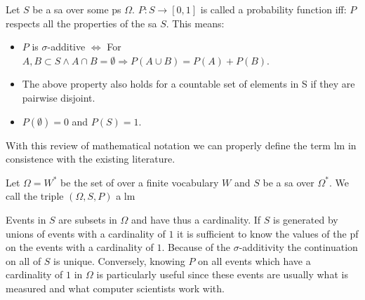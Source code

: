 \documentclass[•]{book}
\begin{document}
\begin{definition}\label{def:pf}
Let $S$ be a \gls{sa} over some \gls{ps} $\Omega$. $P:S\longrightarrow [0,1]$ is called a probability function iff: 
$P$ respects all the properties of the \gls{sa} $S$.
This means: 
\begin{itemize}
\item $P$ is $\sigma$-additive $\Leftrightarrow$ For $A,B \subset S \land A\cap B = \emptyset \Rightarrow P(A\cup B) = P(A)+P(B)$.
\item The above property also holds for a countable set of elements in S if they are pairwise disjoint. 
\item $P(\emptyset)=0$ and $P(S)=1$. 
\end{itemize}
\end{definition}

With this review of mathematical notation we can properly define the term \gls{lm} in consistence with the existing literature.

\begin{definition}\label{def:lm}
Let $\Omega = W^{*}$ be the set of  over a finite vocabulary $W$ and $S$ be a \gls{sa} over $\Omega^{*}$.
We call the triple $(\Omega, S, P)$ a \gls{lm}
\end{definition} 

\begin{example}\label{ex:continuation}
Events in $S$ are subsets in $\Omega$ and have thus a cardinality.
If $S$ is generated by unions of events with a cardinality of $1$ it is sufficient to know the values of the \gls{pf} on the events with a cardinality of $1$. Because of the $\sigma$-additivity the continuation on all of $S$ is unique.  
Conversely, knowing $P$ on all events which have a cardinality of $1$ in $\Omega$ is particularly useful since these events are usually what is measured and what computer scientists work with.
\end{example}
\end{document}
